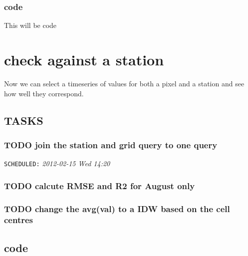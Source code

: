 \documentclass[a4paper]{article}
\begin{document}
\subsubsection{code}
\label{sec-6-4-2}

This will be code
\section{check against a station}
\label{sec-7}

Now we can select a timeseries of values for both a pixel and a station and see how well they correspond. 
\subsection{TASKS}
\label{sec-7-1}
\subsubsection{\textbf{TODO} join the station and grid query to one query}
\label{sec-7-1-1}

   \texttt{SCHEDULED:} \textit{2012-02-15 Wed 14:20}
\subsubsection{\textbf{TODO} calcute RMSE and R2 for August only}
\label{sec-7-1-2}
\subsubsection{\textbf{TODO} change the avg(val) to a IDW based on the cell centres}
\label{sec-7-1-3}
\subsection{code}
\label{sec-7-2}
\end{document}
